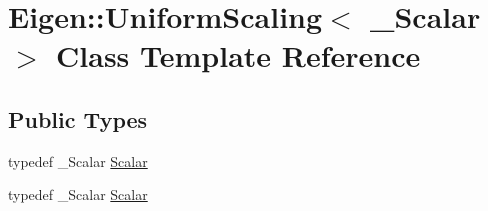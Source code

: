 \hypertarget{class_eigen_1_1_uniform_scaling}{}\section{Eigen\+:\+:Uniform\+Scaling$<$ \+\_\+\+Scalar $>$ Class Template Reference}
\label{class_eigen_1_1_uniform_scaling}
\subsection*{Public Types}
\begin{DoxyCompactItemize}
\item 
typedef \+\_\+\+Scalar \hyperlink{class_eigen_1_1_uniform_scaling_a04c4339f58f1210c5d4d34b1bd7ae283}{Scalar}
\item 
typedef \+\_\+\+Scalar \hyperlink{class_eigen_1_1_uniform_scaling_a04c4339f58f1210c5d4d34b1bd7ae283}{Scalar}
\end{DoxyCompactItemize}

